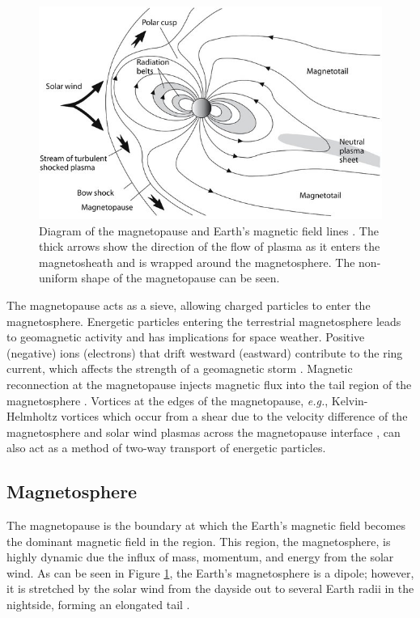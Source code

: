 \begin{figure}
    \centering
    \includegraphics[width=\linewidth]{Figures/magnetosphere.jpg}
    \caption[Diagram of the Earth's magnetopause and magnetic field lines.]{Diagram of the magnetopause and Earth's magnetic field lines \citep{Anderson:2018}. The thick arrows show the direction of the flow of plasma as it enters the magnetosheath and is wrapped around the magnetosphere. The non-uniform shape of the magnetopause can be seen.}
    \label{fig:magnetopause}
\end{figure}

The magnetopause acts as a sieve, allowing charged particles to enter the magnetosphere. Energetic particles entering the terrestrial magnetosphere leads to geomagnetic activity and has implications for space weather. Positive (negative) ions (electrons) that drift westward (eastward) contribute to the ring current, which affects the strength of a geomagnetic storm \citep{Williams:1981}. Magnetic reconnection at the magnetopause injects magnetic flux into the tail region of the magnetosphere \citep{Tsurutani:1990}. Vortices at the edges of the magnetopause, \textit{e.g.}, Kelvin-Helmholtz vortices which occur from a shear due to the velocity difference of the magnetosphere and solar wind plasmas across the magnetopause interface \citep{Nykyri:2001}, can also act as a method of two-way transport of energetic particles.

\subsection{Magnetosphere}
The magnetopause is the boundary at which the Earth's magnetic field becomes the dominant magnetic field in the region. This region, the magnetosphere, is highly dynamic due the influx of mass, momentum, and energy from the solar wind. As can be seen in Figure \ref{fig:magnetopause}, the Earth's magnetosphere is a dipole; however, it is stretched by the solar wind from the dayside out to several Earth radii in the nightside, forming an elongated tail \citep{Borovsky:2018}. %

